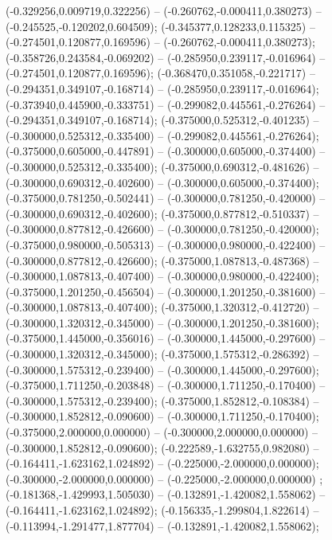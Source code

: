  (-0.329256,0.009719,0.322256) -- (-0.260762,-0.000411,0.380273) -- (-0.245525,-0.120202,0.604509);
 (-0.345377,0.128233,0.115325) -- (-0.274501,0.120877,0.169596) -- (-0.260762,-0.000411,0.380273);
 (-0.358726,0.243584,-0.069202) -- (-0.285950,0.239117,-0.016964) -- (-0.274501,0.120877,0.169596);
 (-0.368470,0.351058,-0.221717) -- (-0.294351,0.349107,-0.168714) -- (-0.285950,0.239117,-0.016964);
 (-0.373940,0.445900,-0.333751) -- (-0.299082,0.445561,-0.276264) -- (-0.294351,0.349107,-0.168714);
 (-0.375000,0.525312,-0.401235) -- (-0.300000,0.525312,-0.335400) -- (-0.299082,0.445561,-0.276264);
 (-0.375000,0.605000,-0.447891) -- (-0.300000,0.605000,-0.374400) -- (-0.300000,0.525312,-0.335400);
 (-0.375000,0.690312,-0.481626) -- (-0.300000,0.690312,-0.402600) -- (-0.300000,0.605000,-0.374400);
 (-0.375000,0.781250,-0.502441) -- (-0.300000,0.781250,-0.420000) -- (-0.300000,0.690312,-0.402600);
 (-0.375000,0.877812,-0.510337) -- (-0.300000,0.877812,-0.426600) -- (-0.300000,0.781250,-0.420000);
 (-0.375000,0.980000,-0.505313) -- (-0.300000,0.980000,-0.422400) -- (-0.300000,0.877812,-0.426600);
 (-0.375000,1.087813,-0.487368) -- (-0.300000,1.087813,-0.407400) -- (-0.300000,0.980000,-0.422400);
 (-0.375000,1.201250,-0.456504) -- (-0.300000,1.201250,-0.381600) -- (-0.300000,1.087813,-0.407400);
 (-0.375000,1.320312,-0.412720) -- (-0.300000,1.320312,-0.345000) -- (-0.300000,1.201250,-0.381600);
 (-0.375000,1.445000,-0.356016) -- (-0.300000,1.445000,-0.297600) -- (-0.300000,1.320312,-0.345000);
 (-0.375000,1.575312,-0.286392) -- (-0.300000,1.575312,-0.239400) -- (-0.300000,1.445000,-0.297600);
 (-0.375000,1.711250,-0.203848) -- (-0.300000,1.711250,-0.170400) -- (-0.300000,1.575312,-0.239400);
 (-0.375000,1.852812,-0.108384) -- (-0.300000,1.852812,-0.090600) -- (-0.300000,1.711250,-0.170400);
 (-0.375000,2.000000,0.000000) -- (-0.300000,2.000000,0.000000) -- (-0.300000,1.852812,-0.090600);
 (-0.222589,-1.632755,0.982080) -- (-0.164411,-1.623162,1.024892) -- (-0.225000,-2.000000,0.000000);
 (-0.300000,-2.000000,0.000000) -- (-0.225000,-2.000000,0.000000) ;
 (-0.181368,-1.429993,1.505030) -- (-0.132891,-1.420082,1.558062) -- (-0.164411,-1.623162,1.024892);
 (-0.156335,-1.299804,1.822614) -- (-0.113994,-1.291477,1.877704) -- (-0.132891,-1.420082,1.558062);
